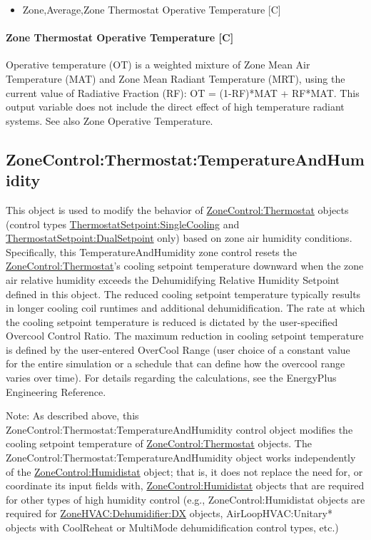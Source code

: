 \begin{itemize}
\tightlist
\item
  Zone,Average,Zone Thermostat Operative Temperature {[}C{]}
\end{itemize}

\paragraph{Zone Thermostat Operative Temperature {[}C{]}}\label{zone-thermostat-operative-temperature-c}

Operative temperature (OT) is a weighted mixture of Zone Mean Air Temperature (MAT) and Zone Mean Radiant Temperature (MRT), using the current value of Radiative Fraction (RF): OT = (1-RF)*MAT + RF*MAT. This output variable does not include the direct effect of high temperature radiant systems. See also Zone Operative Temperature.

\subsection{ZoneControl:Thermostat:TemperatureAndHumidity}\label{zonecontrolthermostattemperatureandhumidity}

This object is used to modify the behavior of \hyperref[zonecontrolthermostat]{ZoneControl:Thermostat} objects (control types \hyperref[thermostatsetpointsinglecooling]{ThermostatSetpoint:SingleCooling} and \hyperref[thermostatsetpointdualsetpoint]{ThermostatSetpoint:DualSetpoint} only) based on zone air humidity conditions. Specifically, this TemperatureAndHumidity zone control resets the \hyperref[zonecontrolthermostat]{ZoneControl:Thermostat}'s cooling setpoint temperature downward when the zone air relative humidity exceeds the Dehumidifying Relative Humidity Setpoint defined in this object. The reduced cooling setpoint temperature typically results in longer cooling coil runtimes and additional dehumidification. The rate at which the cooling setpoint temperature is reduced is dictated by the user-specified Overcool Control Ratio. The maximum reduction in cooling setpoint temperature is defined by the user-entered OverCool Range (user choice of a constant value for the entire simulation or a schedule that can define how the overcool range varies over time). For details regarding the calculations, see the EnergyPlus Engineering Reference.

Note: As described above, this ZoneControl:Thermostat:TemperatureAndHumidity control object modifies the cooling setpoint temperature of \hyperref[zonecontrolthermostat]{ZoneControl:Thermostat} objects. The ZoneControl:Thermostat:TemperatureAndHumidity object works independently of the \hyperref[zonecontrolhumidistat]{ZoneControl:Humidistat} object; that is, it does not replace the need for, or coordinate its input fields with, \hyperref[zonecontrolhumidistat]{ZoneControl:Humidistat} objects that are required for other types of high humidity control (e.g., ZoneControl:Humidistat objects are required for \hyperref[zonehvacdehumidifierdx]{ZoneHVAC:Dehumidifier:DX} objects, AirLoopHVAC:Unitary* objects with CoolReheat or MultiMode dehumidification control types, etc.)

